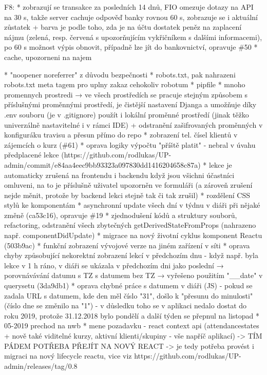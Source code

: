 F8:
* zobrazují se transakce za posledních 14 dnů, FIO omezuje dotazy na API na 30 s, takže server cachuje odpověď banky rovnou 60 s, zobrazuje se i aktuální zůstatek + barva je podle toho, zda je na účtu dostatek peněz na zaplacení nájmu (zelená, resp. červená s upozorňujícím vykřičníkem s dalšími informacemi), po 60 s možnost výpis obnovit, případně lze jít do bankovnictví, opravuje \#50
* cache, upozorneni na najem

* "noopener noreferrer" z důvodu bezpečnosti
* robots.txt, pak nahrazeni robots.txt meta tagem pro uplny zakaz cehokoliv robotum
* pipfile
* mnoho promennych prostredi → ve všech prostředích se pracuje stejným způsobem s příslušnými proměnnými prostředí, je čistější nastavení Djanga a umožňuje díky .env souboru (je v .gitignore) použít i lokální proměnné prostředí (jinak těžko univerzálně nastavitelné i v rámci IDE) + odstranění zašifrovaných proměnných v konfiguráku travisu a přesun přímo do repo
* zobrazení tel. čísel klientů v zájemcích o kurz (\#61)
* oprava logiky výpočtu "příště platit" - nebral v úvahu předplacené lekce (https://github.com/rodlukas/UP-admin/commit/e84aa4eec9bb93323a097830dd1416204658c87a)
* lekce je automaticky zrušená na frontendu i backendu když jsou všichni účastníci omluveni, na to je příslušně uživatel upozorněn ve formuláři (a zároveň zrušení nejde měnit, protože by backend lekci stejně tak či tak zrušil)
* rozdělení CSS stylů ke komponentám
* asynchronní update všech dní v týdnu v diáři při nějaké změně (ca53c16), opravuje \#19
* zjednodušení kódů a struktury souborů, refactoring, odstranění všech zbytečných getDerivedStateFromProps (nahrazeno např. componentDidUpdate)
* migrace na nový životní cyklus komponent Reactu (503b9ac)
* funkční zobrazení vývojové verze na jiném zařízení v síti
* oprava chyby způsobující nekorektní zobrazení lekcí v předchozím dnu - když např. byla lekce v 1 h ráno, v diáři se ukázala v předchozím dni jako poslední → porovnávávání datumu s TZ s datumem bez TZ → vyřešeno použitím "\_\_date" v querysetu (3da9db1)
* oprava chybné práce s datumem v diáři (JS) - pokud se zadala URL s datumem, kde den měl číslo "31", došlo k "přesunu do minulosti" (číslo dne se změnilo na "1") - v důsledku toho se v aplikaci nedalo dostat do roku 2019, protože 31.12.2018 bylo pondělí a další týden se přepnul na listopad
* 05-2019 prechod na nwb
* mene pozadavku - react context api (attendancestates + nově také viditelné kurzy, aktivní klienti/skupiny - vše napříč aplikací) -> TÍM PÁDEM POTŘEBA PŘEJÍT NA NOVÝ REACT -> je tedy potřeba provést i migraci na nový lifecycle reactu, vice viz https://github.com/rodlukas/UP-admin/releases/tag/0.8

